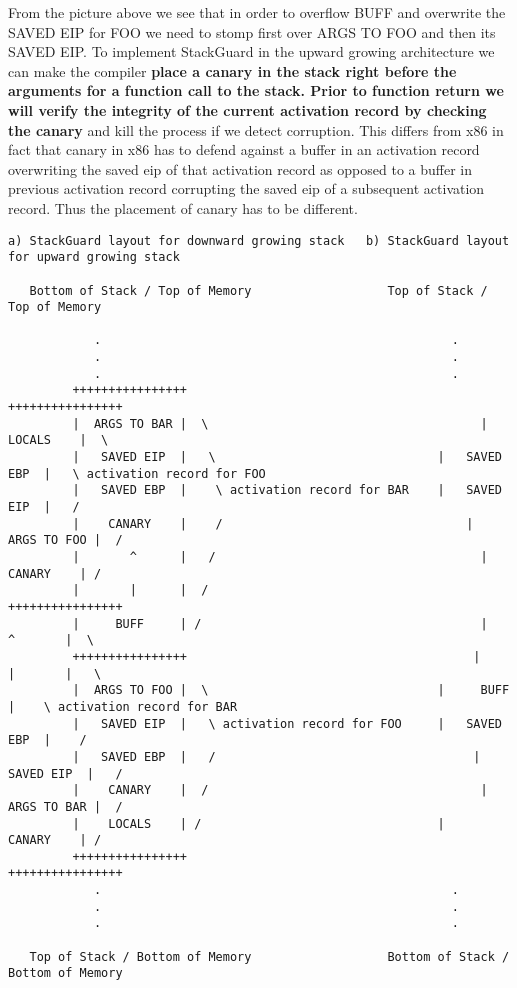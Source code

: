 \noindent From the picture above we see that in order to overflow BUFF and overwrite the SAVED EIP for FOO we need to stomp first over ARGS TO FOO and then its SAVED EIP. To implement StackGuard in the upward growing architecture we can make the compiler \textbf{place a canary in the stack right before the arguments for a function call to the stack. Prior to function return we will verify the integrity of the current activation record by checking the canary} and kill the process if we detect corruption. 
This differs from x86 in fact that canary in x86 has to defend against a buffer in an activation record overwriting the saved eip of that activation record as opposed to a buffer in previous activation record corrupting the saved eip of a subsequent activation record. Thus the placement of canary has to be different. 
\begin{verbatim}
a) StackGuard layout for downward growing stack   b) StackGuard layout for upward growing stack 

   Bottom of Stack / Top of Memory                   Top of Stack / Top of Memory
      
            .                                                 . 
            .                                                 .
            .                                                 .
 		 ++++++++++++++++ 		                                 ++++++++++++++++
 		 |  ARGS TO BAR |  \ 		                              |    LOCALS    |  \
 		 |   SAVED EIP  |   \  	                            |   SAVED EBP  |   \ activation record for FOO
 		 |   SAVED EBP  |    \ activation record for BAR    |   SAVED EIP  |   /
 		 |    CANARY    |    / 		                            |  ARGS TO FOO |  /
 		 |       ^      |   / 	  		                          |    CANARY    | /
 		 |       |      |  /  		                             ++++++++++++++++
 		 |     BUFF     | /	     		                          |      ^       |  \
 		 ++++++++++++++++ 		                                 |      |       |   \
 		 |  ARGS TO FOO |  \                                |     BUFF     |    \ activation record for BAR  
 		 |   SAVED EIP  |   \ activation record for FOO     |   SAVED EBP  |    /  
 		 |   SAVED EBP  |   / 		                             |   SAVED EIP  |   /
 		 |    CANARY    |  / 		                              |  ARGS TO BAR |  /
 		 |    LOCALS    | /	                           	    |    CANARY    | /
 		 ++++++++++++++++ 	                            	    ++++++++++++++++
            .                                                 .
            .                                                 .
            .                                                 .

   Top of Stack / Bottom of Memory                   Bottom of Stack / Bottom of Memory
\end{verbatim}



